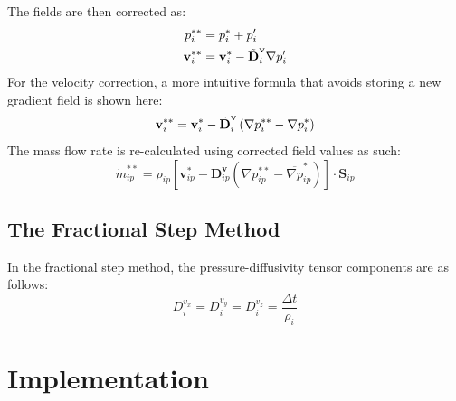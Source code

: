 \documentclass[12pt]{extarticle}
\newcommand{\<}{\langle}
\renewcommand{\>}{\rangle}
\theoremstyle{definition}
\begin{document}
The fields are then corrected as:
\begin{align}
p_i^{**} &= p_i^{*} + p_i^{\prime} \\
\textbf{v}_i^{**} &= \textbf{v}_i^{*}  - \Tilde{\textbf{D}}^{\textbf{v}}_i \nabla p^\prime_i
\end{align}
For the velocity correction, a more intuitive formula that avoids storing a new gradient field is shown here:
\begin{equation}
    \textbf{v}_i^{**} = \textbf{v}_i^{*}  - \Tilde{\textbf{D}}^{\textbf{v}}_i \left(\nabla p^{**}_i - \nabla p^{*}_i\right)
\end{equation}
The mass flow rate is re-calculated using corrected field values as such:
\begin{equation}
    \dot{m}^{**}_{ip} = \rho_{ip} \left[\textbf{v}^{*}_{ip} - \textbf{D}^{\textbf{v}}_{ip} \left ( \nabla p_{ip}^{**} - \overline{\nabla p}_{ip}^{*} \right)\right] \cdot \textbf{S}_{ip}
\end{equation}

\subsection{The Fractional Step Method}
In the fractional step method, the pressure-diffusivity tensor components are as follows:
\begin{equation}
    D^{v_x}_i = D^{v_y}_i = D^{v_z}_i =\frac{\Delta t}{\rho_i}
\end{equation}

\section{Implementation}
\end{document}
